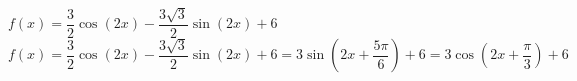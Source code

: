 {$f(x) = \dfrac{3}{2} \cos(2x) - \dfrac{3\sqrt{3}}{2} \sin(2x) + 6$}
{ $f(x) = \dfrac{3}{2} \cos(2x) - \dfrac{3\sqrt{3}}{2} \sin(2x) + 6 =3\sin\left(2x + \dfrac{5\pi}{6}\right) + 6   = 3\cos\left(2x + \dfrac{\pi}{3}\right) + 6$}

